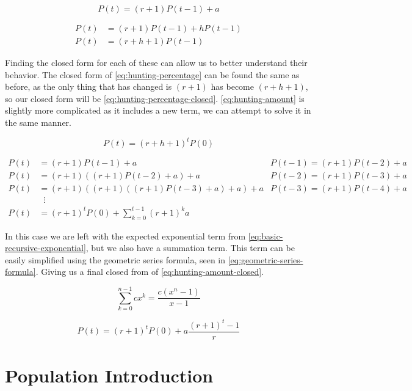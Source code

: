 \documentclass{article}
\begin{document}
\begin{equation}\label{eq:hunting-amount}
    P(t) = (r+1)P(t-1) + a
\end{equation}

\begin{align}\label{eq:hunting-percentage}
    P(t) &= (r+1)P(t-1) + hP(t-1) \nonumber \\
    P(t) &= (r+h+1)P(t-1)
\end{align}

Finding the closed form for each of these can allow us to better understand their behavior. The closed form of \autoref{eq:hunting-percentage} can be found the same as before, as the only thing that has changed is $(r+1)$ has become $(r+h+1)$, so our closed form will be \autoref{eq:hunting-percentage-closed}. \autoref{eq:hunting-amount} is slightly more complicated as it includes a new term, we can attempt to solve it in the same manner.

\begin{equation}\label{eq:hunting-percentage-closed}
    P(t) = (r+h+1)^tP(0)
\end{equation}

\begin{align*}
    P(t) &= (r+1)P(t-1) + a & P(t-1) = (r+1)P(t-2) + a \\
    P(t) &= (r+1)((r+1)P(t-2) + a) + a & P(t-2) = (r+1)P(t-3) + a \\
    P(t) &= (r+1)((r+1)((r+1)P(t-3) + a) + a) + a & P(t-3) = (r+1)P(t-4) + a \\
    &\phantom{x}\vdots \\
    P(t) &= (r+1)^tP(0) + \sum_{k=0}^{t-1}(r+1)^ka
\end{align*}

In this case we are left with the expected exponential term from \autoref{eq:basic-recursive-exponential}, but we also have a summation term. This term can be easily simplified using the geometric series formula, seen in \autoref{eq:geometric-series-formula}. Giving us a final closed from of \autoref{eq:hunting-amount-closed}.

\begin{equation}\label{eq:geometric-series-formula}
    \sum_{k=0}^{n-1}cx^k=\frac{c(x^n-1)}{x-1}
\end{equation}

\begin{equation}\label{eq:hunting-amount-closed}
    P(t) = (r+1)^tP(0) + a\frac{(r+1)^t-1}{r}
\end{equation}


\section{Population Introduction}
    
\end{document}
